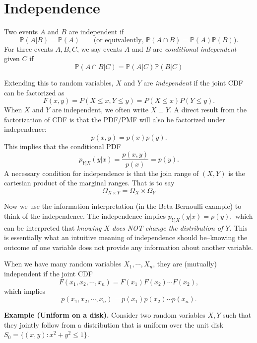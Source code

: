 \documentclass[twoside]{article}
\begin{document}
\section{Independence}

Two events $A$ and $B$ are independent if 
$$
\mathbb{P}(A|B) = \mathbb{P}(A)\qquad \mbox{(or equivalently, $\mathbb{P}(A\cap B) = \mathbb{P}(A)\mathbb{P}(B)$)}.
$$
For three events $A,B,C$, we say events $A$ and $B$ are \emph{conditional independent}
given $C$  if 
$$
\mathbb{P}(A\cap B|C) = \mathbb{P}(A|C) \mathbb{P}(B|C)
$$


Extending this to random variables, $X$ and $Y$ are \emph{independent}
if the joint CDF can be factorized as
$$
F(x,y) = P(X\leq x, Y\leq y) = P(X\leq x) P(Y\leq y).
$$
When $X$ and $Y$ are {independent}, we often write $X\perp Y$.
A direct result from the factorization of CDF is that the PDF/PMF will also be factorized under independence:
$$
p(x,y) = p(x)p(y).
$$
This implies that the conditional PDF 
$$
p_{Y|X}(y|x) = \frac{p(x,y)}{p(x)} = p(y).
$$
A necessary condition for independence is that the join range of $(X,Y)$ is the cartesian product of the marginal ranges. That is to say
$$\Omega_{X\times Y}= \Omega_X \times \Omega_Y$$

Now we use the information interpretation (in the Beta-Bernoulli example) to think of the independence. 
The independence implies $p_{Y|X}(y|x)  = p(y),$
which can be interpreted that \emph{knowing $X$ does NOT change the distribution of $Y$.}
This is essentially what an intuitive meaning of independence should be--knowing the outcome of one variable does not provide any information about another variable.


When we have many random variables $X_1,\cdots, X_n$,
they are (mutually) independent if the joint CDF
$$
F(x_1,x_2,\cdots, x_n) = F(x_1)F(x_2)\cdots F(x_2),
$$
which implies
$$
p(x_1,x_2,\cdots,x_n) = p(x_1)p(x_2)\cdots p(x_n).
$$



{\bf Example (Uniform on a disk).}
Consider two random variables $X,Y$ such that they jointly follow from a distribution that is uniform over the unit disk $S_0 = \{(x,y): x^2+y^2\leq1\}$.



\end{document}
